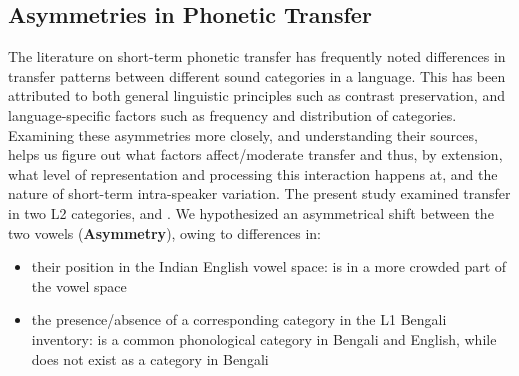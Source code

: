 \documentclass[12 pt]{article}
\newcommand{\nt}[1]{\textipa{[#1]}} %
\begin{document}
\subsection{Asymmetries in Phonetic Transfer}
The literature on short-term phonetic transfer has frequently noted differences in transfer patterns between different sound categories in a language. This has been attributed to both general linguistic principles such as contrast preservation, and language-specific factors such as frequency and distribution of categories. Examining these asymmetries more closely, and understanding their sources, helps us figure out what factors affect/moderate transfer and thus, by extension, what level of representation and processing this interaction happens at, and the nature of short-term intra-speaker variation. 
The present study examined transfer in two L2 categories, \nt{2} and \nt{\ae}. We hypothesized an asymmetrical shift between the two vowels (\textbf{Asymmetry}), owing to differences in:
 \begin{itemize}
 	\item their position in the Indian English vowel space: \nt{\ae} is in a more crowded part of the vowel space
 	\item the presence/absence of a corresponding category in the L1 Bengali inventory: \nt{\ae} is a common phonological category in Bengali and English, while \nt{2} does not exist as a category in Bengali
 \end{itemize}
\end{document}
